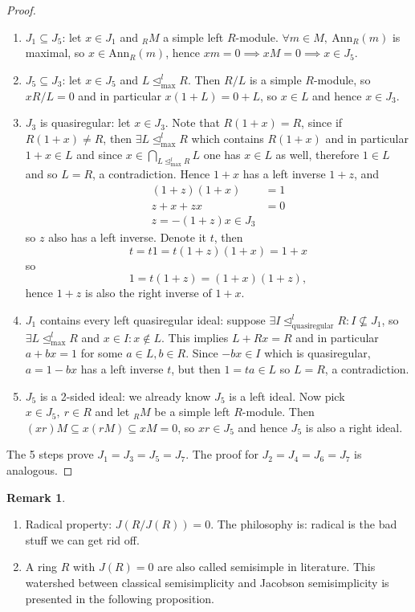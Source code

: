 \documentclass[a4paper]{article}
\newcommand{\Ann}{\text{Ann}}
\theoremstyle{definition}
\newtheorem*{remark}{Remark}
\begin{document}
\begin{proof}
\begin{enumerate}
\item $J_1\subseteq J_5$: let $x\in J_1$ and $_RM$ a simple left $R$-module. $\forall m\in M,\ \Ann_R(m)$ is maximal, so $x\in\Ann_R(m)$, hence $xm=0\implies xM=0\implies x\in J_5$.
\item $J_5\subseteq J_3$: let $x\in J_5$ and $L\unlhd^l_{\text{max}}R$. Then $R/L$ is a simple $R$-module, so $xR/L=0$ and in particular $x(1+L)=0+L$, so $x\in L$ and hence $x\in J_3$.
\item $J_3$ is quasiregular: let $x\in J_3$. Note that $R(1+x)=R$, since if $R(1+x)\neq R$, then $\exists L\unlhd^l_{\text{max}}R$ which contains $R(1+x)$ and in particular $1+x\in L$ and since $\displaystyle x\in\bigcap_{L\unlhd^l_{\text{max}}R} L$ one has $x\in L$ as well, therefore $1\in L$ and so $L=R$, a contradiction. Hence $1+x$ has a left inverse $1+z$, and
\[
\begin{aligned}
(1+z)(1+x)&=1 \\
z+x+zx&=0\\
z=-(1+z)x\in J_3
\end{aligned}
\]
so $z$ also has a left inverse. Denote it $t$, then
\[
t=t1=t(1+z)(1+x)=1+x
\]
so
\[
1=t(1+z)=(1+x)(1+z),
\]
hence $1+z$ is also the right inverse of $1+x$.
\item $J_1$ contains every left quasiregular ideal: suppose $\exists I\unlhd_{\text{quasiregular}}^l R:I\not\subseteq J_1$, so $\exists L\unlhd_{\text{max}}^l R$ and $x\in I:x\notin L$. This implies $L+Rx=R$ and in particular $a+bx=1$ for some $a\in L,b\in R$. Since $-bx\in I$ which is quasiregular, $a=1-bx$ has a left inverse $t$, but then $1=ta\in L$ so $L=R$, a contradiction. 
\item $J_5$ is a 2-sided ideal: we already know $J_5$ is a left ideal. Now pick $x\in J_5,\ r\in R$ and let $_RM$ be a simple left $R$-module. Then $(xr)M\subseteq x(rM)\subseteq xM=0$, so $xr\in J_5$ and hence $J_5$ is also a right ideal.
\end{enumerate}
The 5 steps prove $J_1=J_3=J_5=J_7$. The proof for $J_2=J_4=J_6=J_7$ is analogous.
\end{proof}

\begin{remark}
\begin{enumerate}
\item Radical property: $J(R/J(R))=0$. The philosophy is: radical is the bad stuff we can get rid off.
\item A ring $R$ with $J(R)=0$ are also called semisimple in literature. This watershed between classical semisimplicity and Jacobson semisimplicity is presented in the following proposition.
\end{enumerate}
\end{remark}
\end{document}
